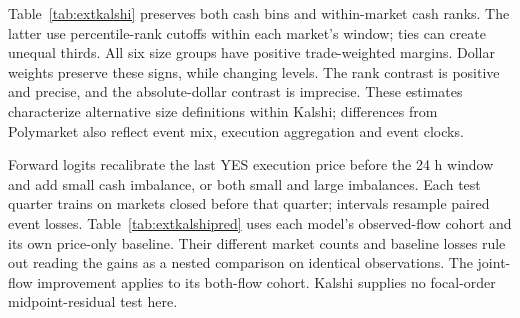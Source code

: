 \documentclass[sigconf,anonymous,nonacm,balance=false]{acmart}
\newcommand{\tabstyle}{\setlength{\tabcolsep}{3pt}}
\begin{document}
Table~\ref{tab:extkalshi} preserves both cash bins and within-market cash ranks. The latter use percentile-rank cutoffs within each market's window; ties can create unequal thirds. All six size groups have positive trade-weighted margins. Dollar weights preserve these signs, while changing levels. The rank contrast is positive and precise, and the absolute-dollar contrast is imprecise. These estimates characterize alternative size definitions within Kalshi; differences from Polymarket also reflect event mix, execution aggregation and event clocks.
\begin{table}[!htbp]
\centering
\caption{Kalshi margins under absolute and within-market relative cash size. Gross probability bp; event-ticker-cluster SEs in parentheses. Contrasts use joint cluster scores for the two means.}
\label{tab:extkalshi}
\tabstyle

\end{table}

Forward logits recalibrate the last YES execution price before the 24 h window and add small cash imbalance, or both small and large imbalances. Each test quarter trains on markets closed before that quarter; intervals resample paired event losses. Table~\ref{tab:extkalshipred} uses each model's observed-flow cohort and its own price-only baseline. Their different market counts and baseline losses rule out reading the gains as a nested comparison on identical observations. The joint-flow improvement applies to its both-flow cohort. Kalshi supplies no focal-order midpoint-residual test here.
\begin{table}[!htbp]
\centering
\caption{Kalshi forward prediction on separate observed-flow cohorts. Price Brier loss, gain and paired event-cluster 95.0\% intervals are multiplied by $10^4$; positive gain favors flow augmentation.}
\label{tab:extkalshipred}
\tabstyle

\end{table}
\end{document}
